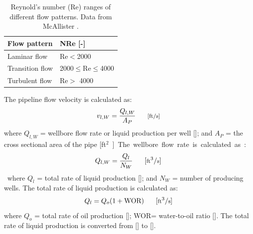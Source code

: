 \documentclass[11pt]{report}
\begin{document}
\begin{table}
\begin{scriptsize}
\caption{Reynold's number (Re) ranges of different flow patterns. Data from McAllister \cite{Mcallister2009}.}
\label{tab:NRe_ranges}
\begin{tabular*}{0.75\columnwidth}{p{}p{}}
\toprule
Flow pattern & NRe [-] \\
\midrule
Laminar flow & Re$<$2000 \\
Transition flow & 2000$\leq$Re$\leq$4000 \\
Turbulent flow & Re$>$ 4000 \\
\bottomrule
\end{tabular*}
\end{scriptsize}
\end{table}

The pipeline flow velocity is calculated as:
\begin{equation} \label{eq:flow_velocity}
v_{l,W}=\frac{Q_{l,W}}{A_{P}} \begin{footnotesize} \quad\quad\text{[ft/s]} \end{footnotesize}
\end{equation}
where $Q_{l,W}$ = wellbore flow rate or liquid production per well []; and \newline $A_{P}$ = the cross sectional area of the pipe [\unit{ft$^2$}]. The wellbore flow rate is calculated as: 
\begin{equation} \label{eq:well_flow_rate}
Q_{l,W} = \frac{Q_{l}}{N_{W}} \begin{footnotesize} \quad\quad[\text{ft}^3/\text{s}] \end{footnotesize}
\end{equation}
where $Q_{l}$ = total rate of liquid production []; and $N_{W}$ = number of producing wells. The total rate of liquid production is calculated as: 
\begin{equation} \label{eq:total_flow_rate}
Q_{l}=Q_{o} (1+ \text{WOR}) \begin{footnotesize} \quad\quad[\text{ft}^3/\text{s}] \end{footnotesize}
\end{equation}
where $Q_{o}$ = total rate of oil production []; WOR= water-to-oil ratio []. The total rate of liquid production is converted from [] to []. 
\end{document}
